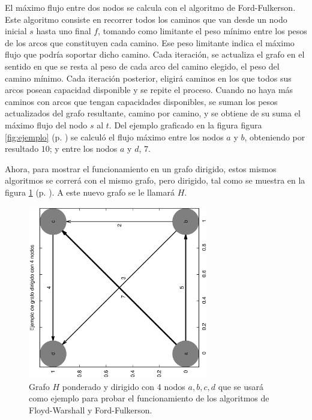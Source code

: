 \documentclass{article}
\begin{document}
  El máximo flujo entre dos nodos se calcula con el algoritmo de Ford-Fulkerson. Este algoritmo consiste en recorrer todos los caminos que van desde un nodo inicial $s$ hasta uno final $f$, tomando como limitante el peso mínimo entre los pesos de los arcos que constituyen cada camino. Ese peso limitante indica el máximo flujo que podría soportar dicho camino. Cada iteración, se actualiza el grafo en el sentido en que se resta al peso de cada arco del camino elegido, el peso del camino mínimo. Cada iteración posterior, eligirá caminos en los que todos sus arcos posean capacidad disponible y se repite el proceso. Cuando no haya más caminos con arcos que tengan capacidades disponibles, se suman los pesos actualizados del grafo resultante, camino por camino, y se obtiene de su suma el máximo flujo del nodo $s$ al $t$. Del ejemplo graficado en la figura figura \ref{fig:ejemplo} (p. \pageref{fig:ejemplo}) se calculó el flujo máximo entre los nodos $a$ y $b$, obteniendo por resultado $10$; y entre los nodos $a$ y $d$, $7$.

  Ahora, para mostrar el funcionamiento en un grafo dirigido, estos mismos algoritmos se correrá con el mismo grafo, pero dirigido, tal como se muestra en la figura \ref{fig:ejemploDirigido} (p. \pageref{fig:ejemploDirigido}). A este nuevo grafo se le llamará $H$.

  \begin{figure}[h]
    \includegraphics[width=0.7\textwidth, angle=-90]{ejemploDirigido} %
    \centering
    \caption{Grafo $H$ ponderado y dirigido con 4 nodos $a, b, c, d$ que se usará como ejemplo para probar el funcionamiento de los algoritmos de Floyd-Warshall y Ford-Fulkerson.}
    \label{fig:ejemploDirigido}
  \end{figure}
\end{document}
